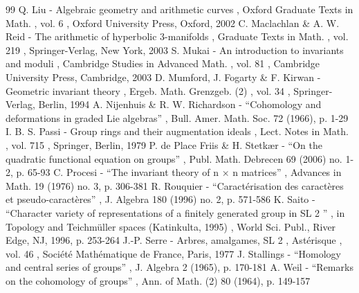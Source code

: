 \documentclass[11pt]{article}
\begin{document}
\begin{thebibliography}{99}
 Q. Liu - Algebraic geometry and arithmetic curves , Oxford Graduate Texts in Math. , vol. 6 , Oxford University Press, Oxford, 2002
 C. Maclachlan \& A. W. Reid - The arithmetic of hyperbolic 3-manifolds , Graduate Texts in Math. , vol. 219 , Springer-Verlag, New York, 2003
 S. Mukai - An introduction to invariants and moduli , Cambridge Studies in Advanced Math. , vol. 81 , Cambridge University Press, Cambridge, 2003
 D. Mumford, J. Fogarty \& F. Kirwan - Geometric invariant theory , Ergeb. Math. Grenzgeb. (2) , vol. 34 , Springer-Verlag, Berlin, 1994
 A. Nijenhuis \& R. W. Richardson - “Cohomology and deformations in graded Lie algebras” , Bull. Amer. Math. Soc. 72 (1966), p. 1-29
 I. B. S. Passi - Group rings and their augmentation ideals , Lect. Notes in Math. , vol. 715 , Springer, Berlin, 1979
 P. de Place Friis \& H. Stetkær - “On the quadratic functional equation on groups” , Publ. Math. Debrecen 69 (2006) no. 1-2, p. 65-93
 C. Procesi - “The invariant theory of n × n matrices” , Advances in Math. 19 (1976) no. 3, p. 306-381
 R. Rouquier - “Caractérisation des caractères et pseudo-caractères” , J. Algebra 180 (1996) no. 2, p. 571-586
 K. Saito - “Character variety of representations of a finitely generated group in SL 2 ” , in Topology and Teichmüller spaces (Katinkulta, 1995) , World Sci. Publ., River Edge, NJ, 1996, p. 253-264
 J.-P. Serre - Arbres, amalgames, SL 2 , Astérisque , vol. 46 , Société Mathématique de France, Paris, 1977
 J. Stallings - “Homology and central series of groups” , J. Algebra 2 (1965), p. 170-181
 A. Weil - “Remarks on the cohomology of groups” , Ann. of Math. (2) 80 (1964), p. 149-157
\end{thebibliography}
\end{document}
